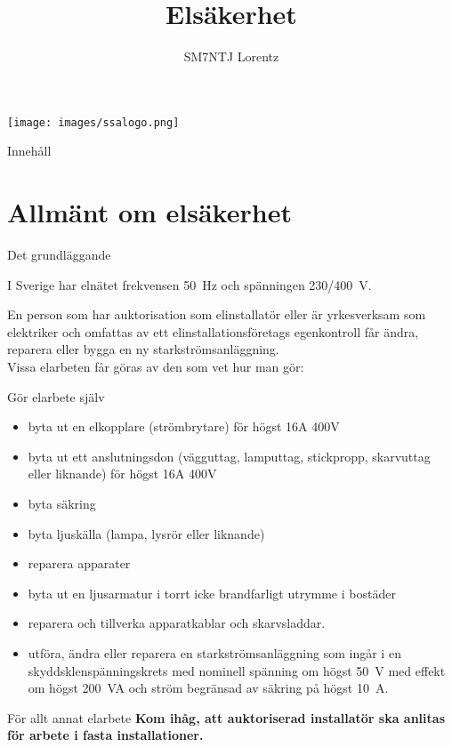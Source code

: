 \documentclass{beamer}
\title{Elsäkerhet}
\author{SM7NTJ Lorentz}
\begin{document}
\begin{frame}
\titlepage
\texttt{[image: images/ssalogo.png]}
\end{frame}

\begin{frame}{Innehåll}
\tableofcontents
\end{frame}

\section{Allmänt om elsäkerhet}

\begin{frame}{Det grundläggande}

I Sverige har elnätet frekvensen 50~Hz och spänningen 230/400~V.

En person som har auktorisation som elinstallatör eller är yrkesverksam som
elektriker och omfattas av ett elinstallationsföretags egenkontroll får ändra,
reparera eller bygga en ny starkströmsanläggning.\\
\vspace{5mm}
Vissa elarbeten får göras av den som vet hur man gör:
\end{frame}

\begin{frame}{Gör elarbete själv}
\begin{itemize}
	\item byta ut en elkopplare (strömbrytare) för högst 16A 400V
	\item byta ut ett anslutningsdon (vägguttag, lamputtag, stickpropp,
	skarvuttag eller liknande) för högst 16A 400V
	\item byta säkring
	\item byta ljuskälla (lampa, lysrör eller liknande)
	\item reparera apparater
	\item byta ut en ljusarmatur i torrt icke brandfarligt utrymme i bostäder
	\item reparera och tillverka apparatkablar och skarvsladdar.
	\item utföra, ändra eller reparera en starkströmsanläggning som ingår i en
	skyddsklenspänningskrets med nominell spänning om högst 50~V med effekt
	om högst 200~VA och ström begränsad av säkring på högst 10~A.
\end{itemize}
\end{frame}

\begin{frame}{För allt annat elarbete}
\textbf{Kom ihåg, att auktoriserad installatör ska anlitas för arbete
	i fasta installationer.}
\end{frame}
\end{document}
